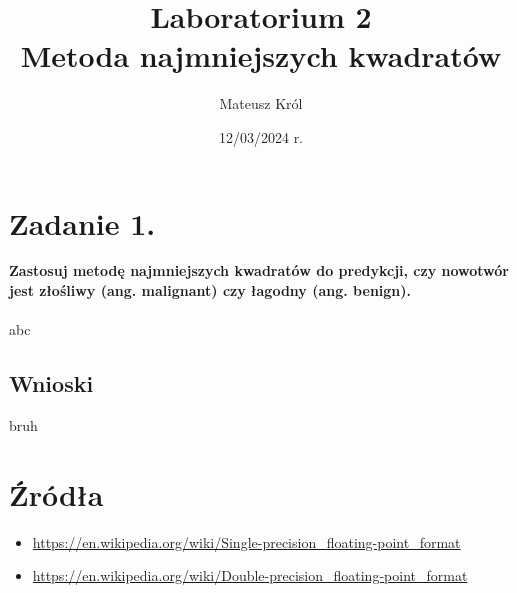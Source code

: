 \documentclass{article}
\title{%
Laboratorium 2\\
  \huge Metoda najmniejszych kwadratów}
\author{Mateusz Król}
\date{12/03/2024 r.}
\begin{document}
\maketitle


\section*{Zadanie 1.}
\textbf{Zastosuj metodę najmniejszych kwadratów do predykcji, czy nowotwór jest złośliwy (ang. malignant) czy łagodny (ang. benign).} 
\\\\
abc
\subsection*{Wnioski}
\null\quad bruh



\section*{Źródła}
\begin{itemize}
    \item \url{https://en.wikipedia.org/wiki/Single-precision_floating-point_format}
    \item \url{https://en.wikipedia.org/wiki/Double-precision_floating-point_format}
\end{itemize}
\end{document}
